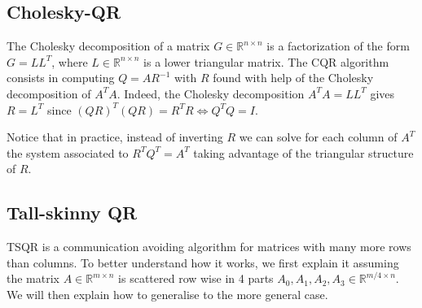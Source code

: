 \documentclass[a4paper, 12pt,oneside]{article}
\begin{document}
		\subsection{Cholesky-QR}
			The Cholesky decomposition of a matrix ${G\in \mathbb{R}^{n\times n}}$ is a factorization of the form ${G} = {L} {L}^T$, where ${L}\in\mathbb{R}^{n\times n}$ is a lower triangular matrix.
			The CQR algorithm consists in computing $Q=AR^{-1}$ with $R$ found with help of the Cholesky decomposition of $A^TA$. Indeed, the Cholesky decomposition $A^TA=LL^T$ gives $R=L^T$ since $(QR)^T(QR)=R^TR\iff Q^TQ=I$. 
			
			Notice that in practice, instead of inverting $R$ we can solve for each column of $A^T$ the system associated to $R^TQ^T=A^T$ taking advantage of the triangular structure of $R$.
		\subsection{Tall-skinny QR}
		TSQR is a communication avoiding algorithm for matrices with many more rows than columns. 
		To better understand how it works, we first explain it assuming the matrix $A\in\mathbb{R}^{m\times n}$ is scattered row wise in 4 parts $A_0, A_1, A_2, A_3 \in \mathbb{R}^{m / 4 \times n}$. We will then explain how to generalise to the more general case. 
		
\end{document}
